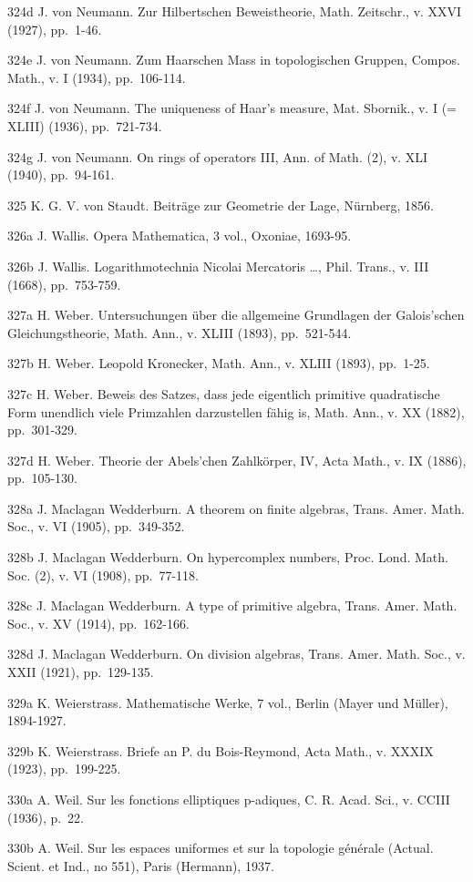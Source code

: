 324d J. von Neumann. Zur Hilbertschen Beweistheorie, Math. Zeitschr., v. XXVI (1927), pp.~1-46.

324e J. von Neumann. Zum Haarschen Mass in topologischen Gruppen, Compos. Math., v. I (1934), pp.~106-114.

324f J. von Neumann. The uniqueness of Haar's measure, Mat. Sbornik., v. I (= XLIII) (1936), pp.~721-734.

324g J. von Neumann. On rings of operators III, Ann. of Math. (2), v. XLI (1940), pp.~94-161.

325 K. G. V. von Staudt. Beiträge zur Geometrie der Lage, Nürnberg, 1856.

326a J. Wallis. Opera Mathematica, 3 vol., Oxoniae, 1693-95.

326b J. Wallis. Logarithmotechnia Nicolai Mercatoris \ldots, Phil. Trans., v. III (1668), pp.~753-759.

327a H. Weber. Untersuchungen über die allgemeine Grundlagen der Galois'schen Gleichungstheorie, Math. Ann., v. XLIII (1893), pp.~521-544.

327b H. Weber. Leopold Kronecker, Math. Ann., v. XLIII (1893), pp.~1-25.

327c H. Weber. Beweis des Satzes, dass jede eigentlich primitive quadratische Form unendlich viele Primzahlen darzustellen fähig is, Math. Ann., v. XX (1882), pp.~301-329.

327d H. Weber. Theorie der Abels'chen Zahlkörper, IV, Acta Math., v. IX (1886), pp.~105-130.

328a J. Maclagan Wedderburn. A theorem on finite algebras, Trans. Amer. Math. Soc., v. VI (1905), pp.~349-352.

328b J. Maclagan Wedderburn. On hypercomplex numbers, Proc. Lond. Math. Soc. (2), v. VI (1908), pp.~77-118.

328c J. Maclagan Wedderburn. A type of primitive algebra, Trans. Amer. Math. Soc., v. XV (1914), pp.~162-166.

328d J. Maclagan Wedderburn. On division algebras, Trans. Amer. Math. Soc., v. XXII (1921), pp.~129-135.

329a K. Weierstrass. Mathematische Werke, 7 vol., Berlin (Mayer und Müller), 1894-1927.

329b K. Weierstrass. Briefe an P. du Bois-Reymond, Acta Math., v. XXXIX (1923), pp.~199-225.

330a A. Weil. Sur les fonctions elliptiques p-adiques, C. R. Acad. Sci., v. CCIII (1936), p.~22.

330b A. Weil. Sur les espaces uniformes et sur la topologie générale (Actual. Scient. et Ind., no 551), Paris (Hermann), 1937.

